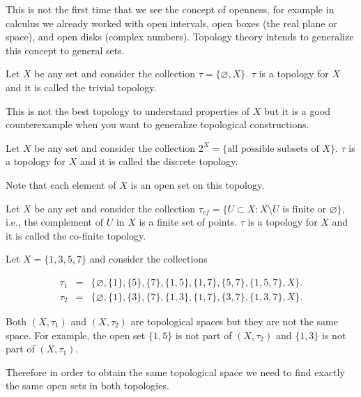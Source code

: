 \documentclass[
	fontsize=10pt, %
	twoside=false, %
	secnumdepth=1, %
]{kaobook}
\begin{document}
This is not the first time that we see the concept of openness, for example in calculus we already worked with open intervals, open boxes (the real plane or space), and open disks (complex numbers). Topology theory intends to generalize this concept to general sets.

\begin{example}
Let $X$ be any set and consider the collection $\tau=\{\varnothing, X\}.$ $\tau$ is a topology for $X$ and it is called the trivial topology. 

This is not the best topology to understand properties of $X$ but it is a good counterexample when you want to generalize topological constructions.
\end{example}

\begin{example}
Let $X$ be any set and consider the collection $2^X=\{\mbox{all possible subsets of } X\}.$ $\tau$ is a topology for $X$ and it is called the discrete topology. 

Note that each element of $X$ is an open set on this topology. 
\end{example}

\begin{example}
Let $X$ be any set and consider the collection $\tau_{cf}=\{U\subset X: X\setminus U \mbox{ is finite or }\varnothing\},$ i.e., the complement of $U$ in $X$ is a finite set of points. $\tau$ is a topology for $X$ and it is called the co-finite topology. 
\end{example}


\begin{example}
Let $X=\{1,3,5,7\}$ and consider the collections

\begin{eqnarray*}
\tau_1 &=& \{\varnothing, \{1\},\{5\},\{7\},\{1,5\},\{1,7\},\{5,7\},\{1,5,7\},X\}. \\
\tau_2 &=& \{\varnothing, \{1\},\{3\},\{7\},\{1,3\},\{1,7\},\{3,7\},\{1,3,7\},X\}.
\end{eqnarray*}

Both $(X,\tau_1)$ and $(X,\tau_2)$ are topological spaces but they are not the same space. For example, the open set $\{1,5\}$ is not part of $(X,\tau_2)$ and $\{1,3\}$ is not part of $(X,\tau_1).$ 

Therefore in order to obtain the same topological space we need to find exactly the same open sets in both topologies.
\end{example}
\end{document}
